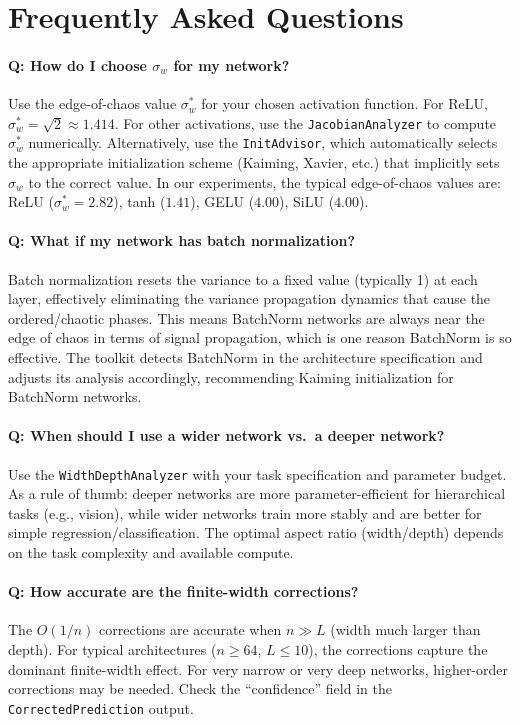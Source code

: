 \documentclass[10pt]{article}
\theoremstyle{definition}
\begin{document}
\section{Frequently Asked Questions}
\label{app:faq}

\paragraph{Q: How do I choose $\sigma_w$ for my network?}
Use the edge-of-chaos value $\sigma_w^*$ for your chosen activation function.
For ReLU, $\sigma_w^* = \sqrt{2} \approx 1.414$.
For other activations, use the \texttt{JacobianAnalyzer} to compute $\sigma_w^*$ numerically.
Alternatively, use the \texttt{InitAdvisor}, which automatically selects the appropriate initialization scheme (Kaiming, Xavier, etc.) that implicitly sets $\sigma_w$ to the correct value.
In our experiments, the typical edge-of-chaos values are: ReLU ($\sigma_w^* = 2.82$), tanh ($1.41$), GELU ($4.00$), SiLU ($4.00$).

\paragraph{Q: What if my network has batch normalization?}
Batch normalization resets the variance to a fixed value (typically 1) at each layer, effectively eliminating the variance propagation dynamics that cause the ordered/chaotic phases.
This means BatchNorm networks are always near the edge of chaos in terms of signal propagation, which is one reason BatchNorm is so effective.
The toolkit detects BatchNorm in the architecture specification and adjusts its analysis accordingly, recommending Kaiming initialization for BatchNorm networks.

\paragraph{Q: When should I use a wider network vs.\ a deeper network?}
Use the \texttt{WidthDepthAnalyzer} with your task specification and parameter budget.
As a rule of thumb: deeper networks are more parameter-efficient for hierarchical tasks (e.g., vision), while wider networks train more stably and are better for simple regression/classification.
The optimal aspect ratio (width/depth) depends on the task complexity and available compute.

\paragraph{Q: How accurate are the finite-width corrections?}
The $O(1/n)$ corrections are accurate when $n \gg L$ (width much larger than depth).
For typical architectures ($n \geq 64$, $L \leq 10$), the corrections capture the dominant finite-width effect.
For very narrow or very deep networks, higher-order corrections may be needed.
Check the ``confidence'' field in the \texttt{CorrectedPrediction} output.
\end{document}
